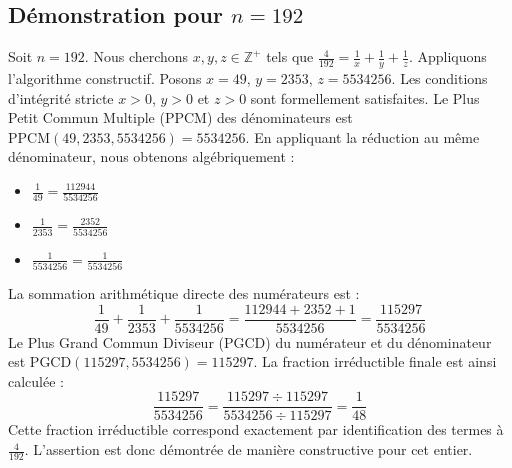 \documentclass[11pt,a4paper]{article}
\begin{document}
\subsection{Démonstration pour $n = 192$}
Soit $n = 192$. Nous cherchons $x, y, z \in \mathbb{Z}^{+}$ tels que $\frac{4}{192} = \frac{1}{x} + \frac{1}{y} + \frac{1}{z}$.
Appliquons l'algorithme constructif. Posons $x = 49$, $y = 2353$, $z = 5534256$.
Les conditions d'intégrité stricte $x > 0$, $y > 0$ et $z > 0$ sont formellement satisfaites.
Le Plus Petit Commun Multiple (PPCM) des dénominateurs est $\text{PPCM}(49, 2353, 5534256) = 5534256$.
En appliquant la réduction au même dénominateur, nous obtenons algébriquement :
\begin{itemize}
    \item $\frac{1}{49} = \frac{112944}{5534256}$
    \item $\frac{1}{2353} = \frac{2352}{5534256}$
    \item $\frac{1}{5534256} = \frac{1}{5534256}$
\end{itemize}
La sommation arithmétique directe des numérateurs est :
$$ \frac{1}{49} + \frac{1}{2353} + \frac{1}{5534256} = \frac{112944 + 2352 + 1}{5534256} = \frac{115297}{5534256} $$
Le Plus Grand Commun Diviseur (PGCD) du numérateur et du dénominateur est $\text{PGCD}(115297, 5534256) = 115297$.
La fraction irréductible finale est ainsi calculée :
$$ \frac{115297}{5534256} = \frac{115297 \div 115297}{5534256 \div 115297} = \frac{1}{48} $$
Cette fraction irréductible correspond exactement par identification des termes à $\frac{4}{192}$. L'assertion est donc démontrée de manière constructive pour cet entier.
\end{document}
